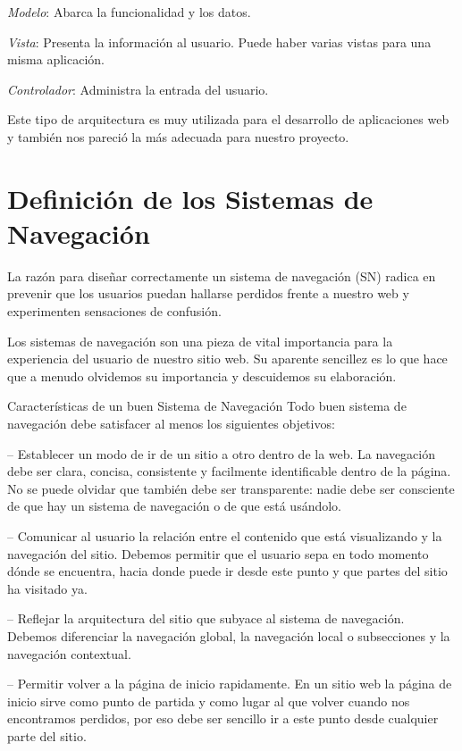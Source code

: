 \textit{Modelo}: Abarca la funcionalidad y los datos.

\textit{Vista}: Presenta la información al usuario. Puede haber varias vistas para una misma aplicación.

\textit{Controlador}: Administra la entrada del usuario.

Este tipo de arquitectura es muy utilizada para el desarrollo de aplicaciones web y también nos pareció la más adecuada para nuestro proyecto.



\section{Definición de los Sistemas de Navegación}

La razón para diseñar correctamente un sistema de navegación (SN) radica en prevenir que los usuarios puedan hallarse perdidos frente a nuestro web y experimenten sensaciones de confusión.

Los sistemas de navegación son una pieza de vital importancia para la experiencia del usuario de nuestro sitio web. Su aparente sencillez es lo que hace que a menudo olvidemos su importancia y descuidemos su elaboración.

Características de un buen Sistema de Navegación
Todo buen sistema de navegación debe satisfacer al menos los siguientes objetivos:

– Establecer un modo de ir de un sitio a otro dentro de la web. La navegación debe ser clara, concisa, consistente y facilmente identificable dentro de la página. No se puede olvidar que también debe ser transparente: nadie debe ser consciente de que hay un sistema de navegación o de que está usándolo.

– Comunicar al usuario la relación entre el contenido que está visualizando y la navegación del sitio. Debemos permitir que el usuario sepa en todo momento dónde se encuentra, hacia donde puede ir desde este punto y que partes del sitio ha visitado ya.

– Reflejar la arquitectura del sitio que subyace al sistema de navegación. Debemos diferenciar la navegación global, la navegación local o subsecciones y la navegación contextual.

– Permitir volver a la página de inicio rapidamente. En un sitio web la página de inicio sirve como punto de partida y como lugar al que volver cuando nos encontramos perdidos, por eso debe ser sencillo ir a este punto desde cualquier parte del sitio.

